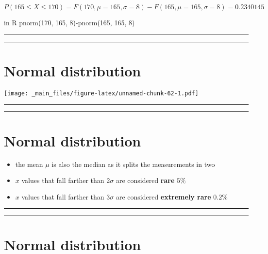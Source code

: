 \documentclass[
]{book}
\providecommand{\tightlist}{%
  \setlength{\itemsep}{0pt}\setlength{\parskip}{0pt}}
\begin{document}
\(P(165 \le X \le 170)=F(170, \mu=165, \sigma=8)-F(165, \mu=165, \sigma=8)=0.2340145\)

in R pnorm(170, 165, 8)-pnorm(165, 165, 8)

\begin{center}\rule{0.5\linewidth}{0.5pt}\end{center}

\begin{center}\rule{0.5\linewidth}{0.5pt}\end{center}

\hypertarget{normal-distribution-3}{%
\section{Normal distribution}\label{normal-distribution-3}}

\texttt{[image: \_main\_files/figure-latex/unnamed-chunk-62-1.pdf]}

\begin{center}\rule{0.5\linewidth}{0.5pt}\end{center}

\begin{center}\rule{0.5\linewidth}{0.5pt}\end{center}

\hypertarget{normal-distribution-4}{%
\section{Normal distribution}\label{normal-distribution-4}}

\begin{itemize}
\tightlist
\item
  the mean \(\mu\) is also the median as it splits the measurements in two
\item
  \(x\) values that fall farther than 2\(\sigma\) are considered \textbf{rare} \(5\%\)
\item
  \(x\) values that fall farther than 3\(\sigma\) are considered \textbf{extremely rare} \(0.2\%\)
\end{itemize}

\begin{center}\rule{0.5\linewidth}{0.5pt}\end{center}

\begin{center}\rule{0.5\linewidth}{0.5pt}\end{center}

\hypertarget{normal-distribution-5}{%
\section{Normal distribution}\label{normal-distribution-5}}
\end{document}
